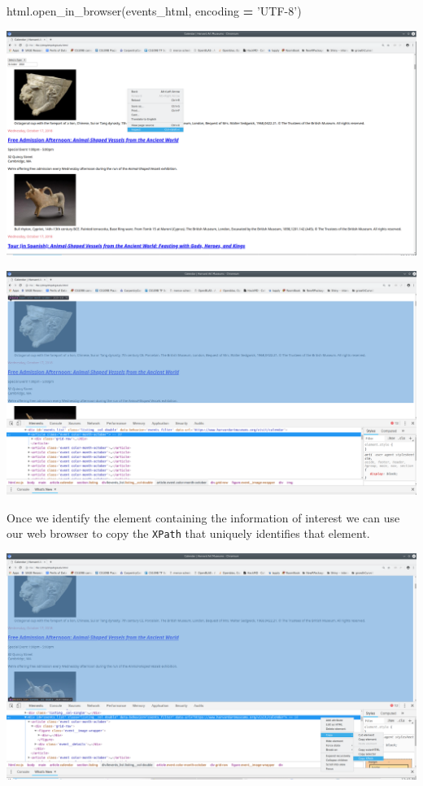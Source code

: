 \documentclass[
]{book}
\newenvironment{Shaded}{\begin{snugshade}}{\end{snugshade}}
\newcommand{\NormalTok}[1]{#1}
\newcommand{\OperatorTok}[1]{\textcolor[rgb]{0.81,0.36,0.00}{\textbf{#1}}}
\newcommand{\StringTok}[1]{\textcolor[rgb]{0.31,0.60,0.02}{#1}}
\begin{document}
\begin{Shaded}
\begin{Highlighting}[]
\NormalTok{html.open_in_browser(events_html, encoding }\OperatorTok{=} \StringTok{'UTF-8'}\NormalTok{)}
\end{Highlighting}
\end{Shaded}

\includegraphics{Python/PythonWebScrape/images/dev_tools_right_click.png}

\includegraphics{Python/PythonWebScrape/images/dev_tools_inspect.png}

Once we identify the element containing the information of interest we
can use our web browser to copy the \texttt{XPath} that uniquely identifies
that element.

\includegraphics{Python/PythonWebScrape/images/dev_tools_xpath.png}
\end{document}
